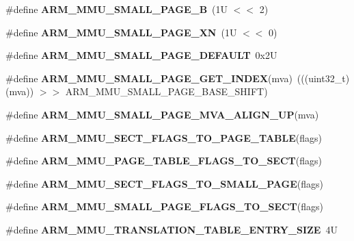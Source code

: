 \begin{DoxyCompactItemize}
\#define {\bfseries A\+R\+M\+\_\+\+M\+M\+U\+\_\+\+S\+M\+A\+L\+L\+\_\+\+P\+A\+G\+E\+\_\+B}~(1\+U $<$$<$ 2)
\item 
\mbox{\label{group__RTEMSScoreCPUARMCP15_ga03a545e87fd2896f7433e79f615d8364}} 
\#define {\bfseries A\+R\+M\+\_\+\+M\+M\+U\+\_\+\+S\+M\+A\+L\+L\+\_\+\+P\+A\+G\+E\+\_\+\+XN}~(1\+U $<$$<$ 0)
\item 
\mbox{\label{group__RTEMSScoreCPUARMCP15_ga3dd280acd372153bc65f4a8a6f98bd28}} 
\#define {\bfseries A\+R\+M\+\_\+\+M\+M\+U\+\_\+\+S\+M\+A\+L\+L\+\_\+\+P\+A\+G\+E\+\_\+\+D\+E\+F\+A\+U\+LT}~0x2U
\item 
\mbox{\label{group__RTEMSScoreCPUARMCP15_ga3ab75242111a1a43eb07826b5e49db5e}} 
\#define {\bfseries A\+R\+M\+\_\+\+M\+M\+U\+\_\+\+S\+M\+A\+L\+L\+\_\+\+P\+A\+G\+E\+\_\+\+G\+E\+T\+\_\+\+I\+N\+D\+EX}(mva)~(((uint32\+\_\+t) (mva)) $>$$>$ A\+R\+M\+\_\+\+M\+M\+U\+\_\+\+S\+M\+A\+L\+L\+\_\+\+P\+A\+G\+E\+\_\+\+B\+A\+S\+E\+\_\+\+S\+H\+I\+FT)
\item 
\#define {\bfseries A\+R\+M\+\_\+\+M\+M\+U\+\_\+\+S\+M\+A\+L\+L\+\_\+\+P\+A\+G\+E\+\_\+\+M\+V\+A\+\_\+\+A\+L\+I\+G\+N\+\_\+\+UP}(mva)
\item 
\#define {\bfseries A\+R\+M\+\_\+\+M\+M\+U\+\_\+\+S\+E\+C\+T\+\_\+\+F\+L\+A\+G\+S\+\_\+\+T\+O\+\_\+\+P\+A\+G\+E\+\_\+\+T\+A\+B\+LE}(flags)
\item 
\#define {\bfseries A\+R\+M\+\_\+\+M\+M\+U\+\_\+\+P\+A\+G\+E\+\_\+\+T\+A\+B\+L\+E\+\_\+\+F\+L\+A\+G\+S\+\_\+\+T\+O\+\_\+\+S\+E\+CT}(flags)
\item 
\#define {\bfseries A\+R\+M\+\_\+\+M\+M\+U\+\_\+\+S\+E\+C\+T\+\_\+\+F\+L\+A\+G\+S\+\_\+\+T\+O\+\_\+\+S\+M\+A\+L\+L\+\_\+\+P\+A\+GE}(flags)
\item 
\#define {\bfseries A\+R\+M\+\_\+\+M\+M\+U\+\_\+\+S\+M\+A\+L\+L\+\_\+\+P\+A\+G\+E\+\_\+\+F\+L\+A\+G\+S\+\_\+\+T\+O\+\_\+\+S\+E\+CT}(flags)
\item 
\mbox{\label{group__RTEMSScoreCPUARMCP15_ga97ca88a8dd5b54145dc00e047ee6239c}} 
\#define {\bfseries A\+R\+M\+\_\+\+M\+M\+U\+\_\+\+T\+R\+A\+N\+S\+L\+A\+T\+I\+O\+N\+\_\+\+T\+A\+B\+L\+E\+\_\+\+E\+N\+T\+R\+Y\+\_\+\+S\+I\+ZE}~4U
\item 
\mbox{\label{group__RTEMSScoreCPUARMCP15_gaa57992a0716ad291f54d8a7ada8008f7}} 
$$
\end{DoxyCompactItemize}
